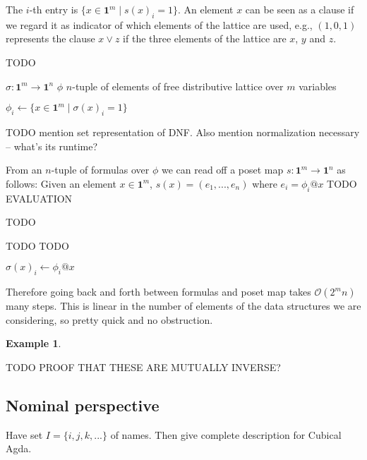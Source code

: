 \documentclass[11pt]{article}
\theoremstyle{definition}
\newtheorem{example}{Example}
\newcommand{\meet}{\vee}
\newcommand{\pint}[1]{\mathbf{1}^{#1}}
\begin{document}
The $i$-th entry is $\{ x \in \pint{m} \mid s(x)_i = 1 \}$. An element $x$ can be
seen as a clause if we regard it as indicator of which elements of the lattice
are used, e.g., $(1,0,1)$ represents the clause $x \meet z$ if the three
elements of the lattice are $x$, $y$ and $z$.

\begin{algorithm}[H]
  \caption{TODO}\label{alg:subst2tele}
  \begin{algorithmic}
    \Require $\sigma : \pint{m} \to \pint{n}$
    \Ensure $\phi$ $n$-tuple of elements of free distributive lattice over $m$ variables

      \State $\phi_i \gets \{ x \in \pint{m} \mid \sigma(x)_i = 1 \}$
      \Comment{$\mathcal{O}(2^m)$ many elements in $\pint{m}$}
    \EndFor
    \State {}
    \EndProcedure
  \end{algorithmic}
\end{algorithm}

TODO mention set representation of DNF. Also mention normalization necessary --
what's its runtime?

From an $n$-tuple of formulas over $\phi$ we can read off a poset map $s :
\pint{m} \to \pint{n}$ as follows: Given an element $x \in \pint{m}$, $s(x) = (e_1
, ... , e_n) $ where $e_i = \phi_i @ x$ TODO EVALUATION

\begin{algorithm}[H]
  \caption{TODO}\label{alg:teletosubst}
  \begin{algorithmic}
    \Require TODO
    \Ensure TODO

    \For{$x \gets \pint{m}$} 
        \State $\sigma(x)_i \gets \phi_i @ x$
      \EndFor
    \EndFor
    \State \Return{$\sigma$}
    \EndProcedure
  \end{algorithmic}
\end{algorithm}


Therefore going back and forth between formulas and poset map takes
$\mathcal{O}(2^mn)$ many steps. This is linear in the number of elements of the
data structures we are considering, so pretty quick and no obstruction.

\begin{example}
\end{example}

TODO PROOF THAT THESE ARE MUTUALLY INVERSE?


\subsection{Nominal perspective}

Have set $I = \{i , j, k , ...\}$ of names. Then give complete description for
Cubical Agda.
\end{document}
